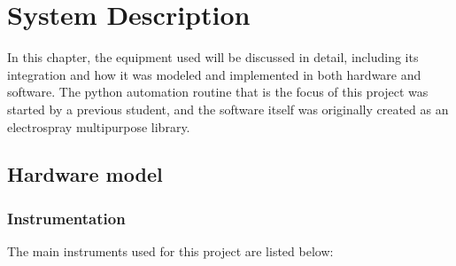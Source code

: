 \chapter{System Description}
\label{chap:system_description}

In this chapter, the equipment used will be discussed in detail, including its integration and how it was modeled and implemented in both hardware and software. 
The python automation routine that is the focus of this project was started by a previous student\cite{Monica}, and the software itself was originally created as an electrospray multipurpose library.

\section{Hardware model}
\label{sec:hardware_model}

\subsection{Instrumentation}
\label{subsec:instrumentation}

The main instruments used for this project are listed below:

